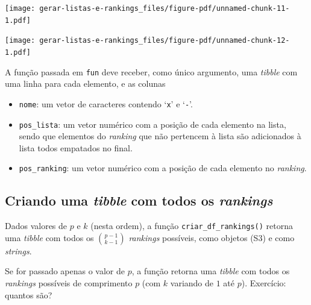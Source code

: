 \documentclass[
  letterpaper,
  DIV=11,
  numbers=noendperiod]{scrreprt}
\newenvironment{Shaded}{\begin{snugshade}}{\end{snugshade}}
\newcommand{\AttributeTok}[1]{\textcolor[rgb]{0.40,0.45,0.13}{#1}}
\newcommand{\DecValTok}[1]{\textcolor[rgb]{0.68,0.00,0.00}{#1}}
\newcommand{\FunctionTok}[1]{\textcolor[rgb]{0.28,0.35,0.67}{#1}}
\newcommand{\NormalTok}[1]{\textcolor[rgb]{0.00,0.23,0.31}{#1}}
\newcommand{\SpecialCharTok}[1]{\textcolor[rgb]{0.37,0.37,0.37}{#1}}
\providecommand{\tightlist}{%
  \setlength{\itemsep}{0pt}\setlength{\parskip}{0pt}}\usepackage{longtable,booktabs,array}
\begin{document}
\begin{center}
\texttt{[image: gerar-listas-e-rankings\_files/figure-pdf/unnamed-chunk-11-1.pdf]}
\end{center}

\begin{Shaded}
\end{Shaded}

\begin{center}
\texttt{[image: gerar-listas-e-rankings\_files/figure-pdf/unnamed-chunk-12-1.pdf]}
\end{center}

A função passada em \texttt{fun} deve receber, como único argumento, uma
\emph{tibble} com uma linha para cada elemento, e as colunas

\begin{itemize}
\tightlist
\item
  \texttt{nome}: um vetor de caracteres contendo `\texttt{x}' e
  `\texttt{-}'.
\item
  \texttt{pos\_lista}: um vetor numérico com a posição de cada elemento
  na lista, sendo que elementos do \emph{ranking} que não pertencem à
  lista são adicionados à lista todos empatados no final.
\item
  \texttt{pos\_ranking}: um vetor numérico com a posição de cada
  elemento no \emph{ranking}.
\end{itemize}

\subsection{\texorpdfstring{Criando uma \emph{tibble} com todos os
\emph{rankings}}{Criando uma tibble com todos os rankings}}\label{criando-uma-tibble-com-todos-os-rankings}

Dados valores de $p$ e $k$ (nesta ordem), a função
\texttt{criar\_df\_rankings()} retorna uma \emph{tibble} com todos os
$\binom{p - 1}{k - 1}$ \emph{rankings} possíveis, como objetos (S3) e
como \emph{strings}.

Se for passado apenas o valor de $p$, a função retorna uma \emph{tibble}
com todos os \emph{rankings} possíveis de comprimento $p$ (com $k$
variando de $1$ até $p$). Exercício: quantos são?
\end{document}
